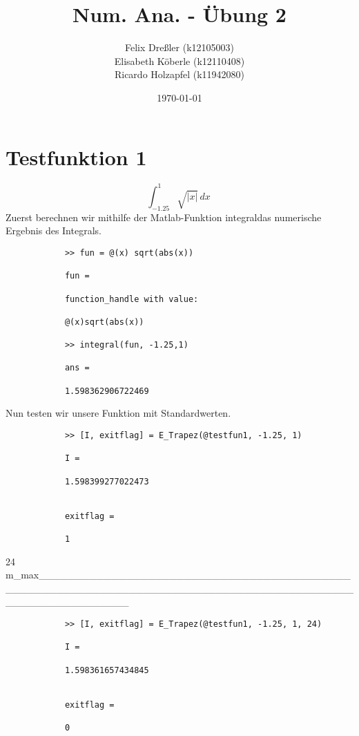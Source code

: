 \documentclass[11pt,titlepage]{article}
\title{Num. Ana. - Übung 2}
\author{Felix Dreßler (k12105003) \\ Elisabeth Köberle (k12110408) \\ Ricardo Holzapfel (k11942080)}
\date{\today} %
\begin{document}
\maketitle

	\section{Testfunktion 1}
		\begin{displaymath}
			\int_{-1.25}^1 \sqrt{|x|} \, dx\
		\end{displaymath}
		Zuerst berechnen wir mithilfe der Matlab-Funktion \glqq integral\grqq  das numerische Ergebnis des Integrals.
		\begin{lstlisting}
			>> fun = @(x) sqrt(abs(x))
			
			fun =
			
			function_handle with value:
			
			@(x)sqrt(abs(x))
			
			>> integral(fun, -1.25,1)
			
			ans =
			
			1.598362906722469
		\end{lstlisting}
		Nun testen wir unsere Funktion mit Standardwerten.
		\begin{lstlisting}
			>> [I, exitflag] = E_Trapez(@testfun1, -1.25, 1)
			
			I =
			
			1.598399277022473
			
			
			exitflag =
			
			1
		\end{lstlisting}
		24 m_max____________________________________________________________________________________________________________
		\begin{lstlisting}
			>> [I, exitflag] = E_Trapez(@testfun1, -1.25, 1, 24)
			
			I =
			
			1.598361657434845
			
			
			exitflag =
			
			0
		\end{lstlisting}
		
\end{document}
